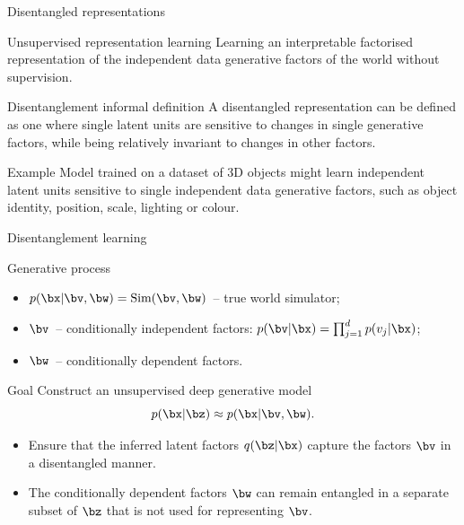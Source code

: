 \begin{frame}{Disentangled representations}
	\begin{block}{Unsupervised representation learning}
	    Learning an interpretable factorised representation of the independent data generative factors of the world without supervision. 
	\end{block}
	\begin{block}{Disentanglement informal definition}
	A disentangled representation can be defined as one where single latent units are sensitive to changes in single generative factors, while being relatively invariant to changes in other factors. 
	\end{block}
	\begin{block}{Example}
	Model trained on a dataset of 3D objects might learn independent latent units sensitive to single independent data generative factors, such as object identity, position, scale, lighting or colour. 
	\end{block}
\end{frame}
\begin{frame}{Disentanglement learning}
	\begin{block}{Generative process}
	\begin{itemize}
	    \item $p(\bx | \bv, \bw) = \text{Sim}(\bv, \bw)$~-- true world simulator;
	    \item $\bv$~-- conditionally independent factors: $p(\bv | \bx) = \prod_{j=1}^d p(v_j | \bx)$;
	    \item $\bw$~-- conditionally dependent factors. 
	\end{itemize}
	\end{block}
	\begin{block}{Goal}
	Construct an unsupervised deep generative model
	\[
	    p(\bx | \bz) \approx p(\bx | \bv, \bw).
	\]
	\vspace{-0.5cm}
	\begin{itemize}
	    \item Ensure that the inferred latent factors $q(\bz|\bx)$ capture the factors $\bv$ in a disentangled manner. 
	    \item The conditionally dependent factors $\bw$ can remain entangled in a separate subset of $\bz$ that is not used for representing $\bv$. 
	\end{itemize}
	\end{block}
\end{frame}
